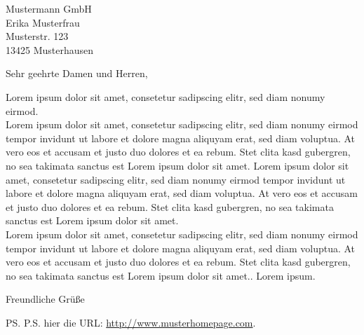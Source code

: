 \documentclass[firstfoot=false]{scrlttr2}
\begin{document}
\begin{letter}{Mustermann GmbH \\ Erika Musterfrau \\ Musterstr. 123 \\ 13425 Musterhausen}

\opening{Sehr geehrte Damen und Herren,}

Lorem ipsum dolor sit amet, consetetur sadipscing elitr, sed diam nonumy eirmod.\\

Lorem ipsum dolor sit amet, consetetur sadipscing elitr, sed diam nonumy eirmod tempor invidunt ut labore et dolore magna aliquyam erat, sed diam voluptua. At vero eos et accusam et justo duo dolores et ea rebum. Stet clita kasd gubergren, no sea takimata sanctus est Lorem ipsum dolor sit amet. Lorem ipsum dolor sit amet, consetetur sadipscing elitr, sed diam nonumy eirmod tempor invidunt ut labore et dolore magna aliquyam erat, sed diam voluptua. At vero eos et accusam et justo duo dolores et ea rebum. Stet clita kasd gubergren, no sea takimata sanctus est Lorem ipsum dolor sit amet.\\

Lorem ipsum dolor sit amet, consetetur sadipscing elitr, sed diam nonumy eirmod tempor invidunt ut labore et dolore magna aliquyam erat, sed diam voluptua. At vero eos et accusam et justo duo dolores et ea rebum. Stet clita kasd gubergren, no sea takimata sanctus est Lorem ipsum dolor sit amet..
Lorem ipsum.

\closing{Freundliche Grüße}
\ps{P.S. hier die URL: \url{http://www.musterhomepage.com}.}

\end{letter}
\end{document}
